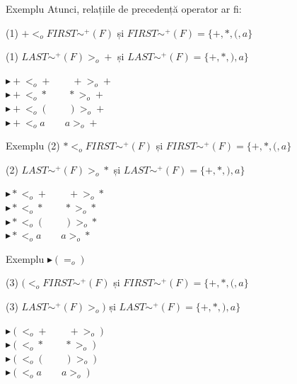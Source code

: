 \documentclass[pdf]{beamer}
\begin{document}
\begin{frame}{Exemplu}
Atunci, relațiile de precedență operator ar fi:
\newline

(1) $+ <_o FIRST\sim^+(F)$ \hspace{1cm} și $FIRST\sim^+(F) = \{ +, *, (, a \}$
\newline

(1) $LAST\sim^+(F) >_o +$ \hspace{1cm} și $LAST\sim^+(F) = \{ +, *, ), a \}$
\newline

$\blacktriangleright + <_o + \qquad + >_o +$\\
$\blacktriangleright + <_o * \qquad * >_o +$\\
$\blacktriangleright + <_o ( \qquad ) >_o +$\\
$\blacktriangleright + <_o a \qquad a >_o +$

\end{frame}



\begin{frame}{Exemplu}
(2) $* <_o FIRST\sim^+(F)$ \hspace{1cm} și $FIRST\sim^+(F) = \{ +, *, (, a \}$
\newline

(2) $LAST\sim^+(F) >_o *$ \hspace{1cm} și $LAST\sim^+(F) = \{ +, *, ), a \}$
\newline

$\blacktriangleright * <_o + \qquad + >_o *$\\
$\blacktriangleright * <_o * \qquad * >_o *$\\
$\blacktriangleright * <_o ( \qquad ) >_o *$\\
$\blacktriangleright * <_o a \qquad a >_o *$

\end{frame}



\begin{frame}{Exemplu}
$\blacktriangleright ( =_o )$
\newline

(3) $( <_o FIRST\sim^+(F)$ \hspace{1cm} și $FIRST\sim^+(F) = \{ +, *, (, a \}$
\newline

(3) $LAST\sim^+(F) >_o )$ \hspace{1cm} și $LAST\sim^+(F) = \{ +, *, ), a \}$
\newline

$\blacktriangleright ( <_o + \qquad + >_o )$\\
$\blacktriangleright ( <_o * \qquad * >_o )$\\
$\blacktriangleright ( <_o ( \qquad ) >_o )$\\
$\blacktriangleright ( <_o a \qquad a >_o )$
\end{frame}
\end{document}
